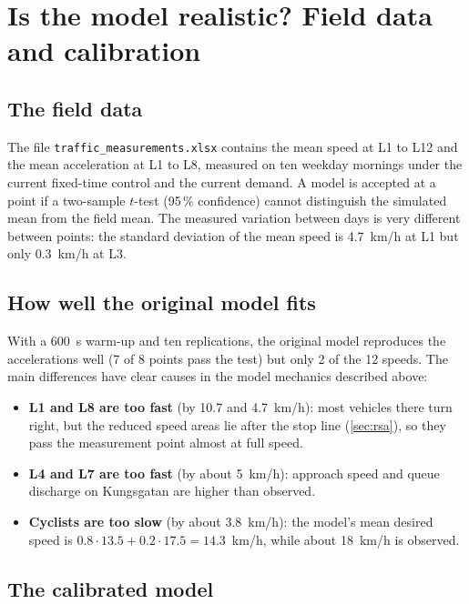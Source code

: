 \documentclass[11pt,a4paper]{article}
\newcommand{\code}[1]{\texttt{#1}}
\newcommand{\kmh}{~km/h}
\begin{document}
\section{Is the model realistic? Field data and calibration}
\label{sec:calibration}

\subsection{The field data}

The file \code{traffic\_measurements.xlsx} contains the mean speed at L1 to L12 and the mean
acceleration at L1 to L8, measured on ten weekday mornings under the current fixed-time control
and the current demand. A model is accepted at a point if a two-sample $t$-test (95\,\% confidence)
cannot distinguish the simulated mean from the field mean. The measured variation between days is
very different between points: the standard deviation of the mean speed is 4.7\kmh{} at L1 but
only 0.3\kmh{} at L3.

\subsection{How well the original model fits}

With a 600~s warm-up and ten replications, the original model reproduces the accelerations well
(7 of 8 points pass the test) but only 2 of the 12 speeds. The main differences have clear causes
in the model mechanics described above:
\begin{itemize}
  \item \textbf{L1 and L8 are too fast} (by 10.7 and 4.7\kmh): most vehicles there turn right, but
        the reduced speed areas lie after the stop line (\cref{sec:rsa}), so they pass the
        measurement point almost at full speed.
  \item \textbf{L4 and L7 are too fast} (by about 5\kmh): approach speed and queue discharge on
        Kungsgatan are higher than observed.
  \item \textbf{Cyclists are too slow} (by about 3.8\kmh): the model's mean desired speed is
        $0.8 \cdot 13.5 + 0.2 \cdot 17.5 = 14.3$\kmh, while about 18\kmh{} is observed.
\end{itemize}

\subsection{The calibrated model}
\end{document}
